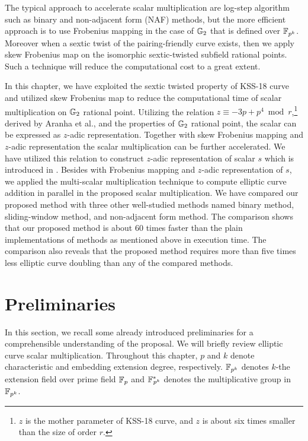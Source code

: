 The typical approach to accelerate scalar multiplication are log-step algorithm such as binary and non-adjacent form (NAF) methods, but the more efficient approach is to use Frobenius mapping in the case of ${\mathbb{G}}_{2}$ that is defined over ${\mathbb{F}}_{p^{k}}$.
Moreover when a sextic twist of the pairing-friendly curve exists, then we apply skew Frobenius map on the isomorphic sextic-twisted subfield rational points. Such a technique will reduce the computational cost to a great extent.

In this chapter, we have exploited the sextic twisted property of KSS-18 curve and utilized skew Frobenius map to reduce the computational time of scalar multiplication on ${\mathbb{G}}_{2}$ rational point. 
Utilizing the relation $z \equiv -3p + p^4 \bmod {r}$,\footnote{$z$ is the mother parameter of KSS-18 curve, and $z$ is about six times smaller than the size of order $r$.} derived by Aranha et al.,\cite{PAIRING:AFKMR12} and the properties of ${\mathbb{G}}_{2}$ rational point, the scalar can be expressed as $z$-adic representation.
Together with skew Frobenius mapping and $z$-adic representation the scalar multiplication can be further accelerated.  
We have utilized this relation to construct $z$-adic representation of scalar $s$ which is introduced in . 
Besides with Frobenius mapping and $z$-adic representation of $s$, we applied the multi-scalar multiplication technique to compute elliptic curve addition in parallel in the proposed scalar multiplication.
We have compared our proposed method with three other well-studied methods named binary method, sliding-window method, and non-adjacent form method. 
The comparison shows that our proposed method is about 60 times faster than the plain implementations of methods as mentioned above in execution time. The comparison also reveals that the proposed method requires more than five times less elliptic curve doubling than any of the compared methods.


\section{Preliminaries}
In this section, we recall some already introduced preliminaries for a comprehensible understanding of the proposal. 
We will briefly review elliptic curve scalar multiplication. 
Throughout this chapter, $p$ and $k$ denote characteristic and embedding extension degree, respectively. $\mathbb{F}_{p^k}$ denotes $k$-the extension field over prime field ${\mathbb{F}}_{p}$ and ${{\mathbb{F}}^{\ast}}_{\!\!\!p^{k}}$ denotes the multiplicative group in $\mathbb{F}_{p^k}$.

